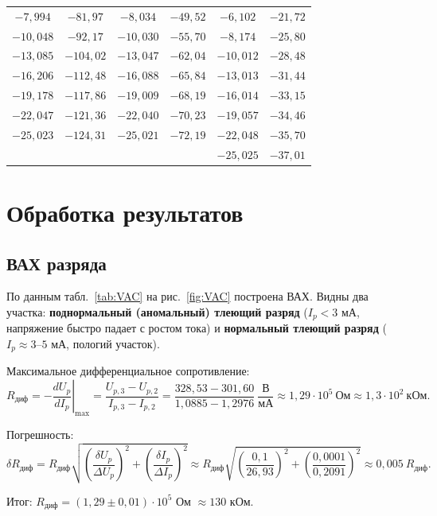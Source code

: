 \documentclass[a4paper]{article}
\begin{document}
\begin{longtable}{|c|c||c|c||c|c|}
		$-7{,}994$ & $-81{,}97$ & $-8{,}034$ & $-49{,}52$ & $-6{,}102$ & $-21{,}72$ \\
		$-10{,}048$ & $-92{,}17$ & $-10{,}030$ & $-55{,}70$ & $-8{,}174$ & $-25{,}80$ \\
		$-13{,}085$ & $-104{,}02$ & $-13{,}047$ & $-62{,}04$ & $-10{,}012$ & $-28{,}48$ \\
		$-16{,}206$ & $-112{,}48$ & $-16{,}088$ & $-65{,}84$ & $-13{,}013$ & $-31{,}44$ \\
		$-19{,}178$ & $-117{,}86$ & $-19{,}009$ & $-68{,}19$ & $-16{,}014$ & $-33{,}15$ \\
		$-22{,}047$ & $-121{,}36$ & $-22{,}040$ & $-70{,}23$ & $-19{,}057$ & $-34{,}46$ \\
		$-25{,}023$ & $-124{,}31$ & $-25{,}021$ & $-72{,}19$ & $-22{,}048$ & $-35{,}70$ \\
		& & & & $-25{,}025$ & $-37{,}01$ \\
		\hline
	\end{longtable}
	
	\section{Обработка результатов}
	
	\subsection{ВАХ разряда}
	
	По данным табл.~\ref{tab:VAC} на рис.~\ref{fig:VAC} построена ВАХ. Видны два участка: \textbf{поднормальный (аномальный) тлеющий разряд} ($I_p < 3$ мА, напряжение быстро падает с ростом тока) и \textbf{нормальный тлеющий разряд} ($I_p \approx 3$--$5$ мА, пологий участок).
	
	Максимальное дифференциальное сопротивление:
	\[
	R_{\text{диф}} = -\left.\frac{dU_p}{dI_p}\right|_{\max}
	= \frac{U_{p,3}-U_{p,2}}{I_{p,3}-I_{p,2}}
	= \frac{328{,}53 - 301{,}60}{1{,}0885 - 1{,}2976} \ \frac{\text{В}}{\text{мА}}
	\approx 1{,}29\cdot 10^5 \ \text{Ом}
	\approx 1{,}3\cdot 10^2 \ \text{кОм}.
	\]
	
	Погрешность:
	\[
	\delta R_{\text{диф}} = R_{\text{диф}}\sqrt{\left(\frac{\delta U_p}{\Delta U_p}\right)^2 + \left(\frac{\delta I_p}{\Delta I_p}\right)^2}
	\approx R_{\text{диф}}\sqrt{\left(\frac{0{,}1}{26{,}93}\right)^2 + \left(\frac{0{,}0001}{0{,}2091}\right)^2} \approx 0{,}005 \ R_{\text{диф}}.
	\]
	
	Итог: $R_{\text{диф}} = (1{,}29 \pm 0{,}01)\cdot 10^5$ Ом $\approx 130$ кОм.
	
\end{document}
